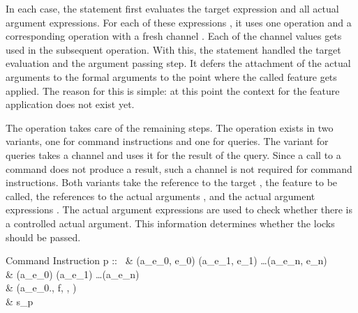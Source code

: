 In each case, the statement first evaluates the target expression and all actual argument expressions. For each of these expressions , it uses one  operation and a corresponding  operation with a fresh channel . Each of the channel values gets used in the subsequent  operation. With this, the statement handled the target evaluation and the argument passing step. It defers the attachment of the actual arguments to the formal arguments to the point where the called feature gets applied. The reason for this is simple: at this point the context for the feature application does not exist yet.

The  operation takes care of the remaining steps. The operation exists in two variants, one for command instructions and one for queries. The variant for queries takes a channel  and uses it for the result of the query. Since a call to a command does not produce a result, such a channel is not required for command instructions. Both  variants take the reference to the target , the feature  to be called, the references to the actual arguments , and the actual argument expressions . The actual argument expressions are used to check whether there is a controlled actual argument. This information determines whether the locks should be passed.

\inferencerule
	{Command Instruction}
	{ }
	{}
	{
		\configuration
			{
				p :: \ & \evaluateoperation(a_{e_{0}}, e_{0}) \statementseparator \evaluateoperation(a_{e_{1}}, e_{1}) \statementseparator \ldots \statementseparator \evaluateoperation(a_{e_{n}}, e_{n}) \statementseparator \\
				& \waitoperation(a_{e_{0}}) \statementseparator \waitoperation(a_{e_{1}}) \statementseparator \ldots \statementseparator \waitoperation(a_{e_{n}}) \statementseparator \\
				& \calloperation(a_{e_{0}}.\datafeature, f, , ) \statementseparator \\
				& s_{p}
			}
			{\state}
	}
 

